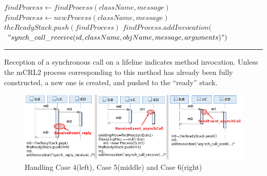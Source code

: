 \documentclass[letter]{llncs}
\newcommand{\figshrink}{\vspace{-.6cm}}
\newcommand{\figshrinkend}{}
\begin{document}
\begin{algorithmic}[1]
     
	\State $findProcess \gets findProcess(className, message)$
		  \State $findProcess \gets new Process(className, message)$
		 \EndIf
		    \State $theReadyStack.push(findProcess)$
		    \State $findProcess.addInvocation($
		     \State $"synch \_ call \_ receive(id,className,objName,message,arguments)")$
		  \EndIf
	\EndCase	
\end{algorithmic}
\hrule
\vspace{2 pt}
Reception of a synchronous call on a lifeline indicates method invocation. Unless the mCRL2 process corresponding to this method has already been
fully constructed, a new one is created, and pushed to the ``ready'' stack.
% 
\begin{figure}[!t]
\centering
\figshrink
\includegraphics[width=1.0\linewidth,keepaspectratio=true]{./Figure5_final.png}
\caption{Handling Case 4(left), Case 5(middle) and Case 6(right)}
\label{fig:Algo}
\figshrinkend
\end{figure}
\end{document}
